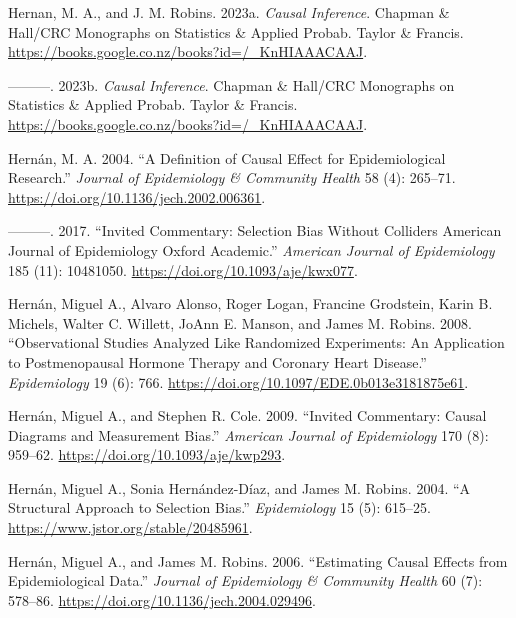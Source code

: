 \documentclass[
  singlecolumn]{report}
\newlength{\cslhangindent}
\newlength{\cslentryspacingunit} %
\newenvironment{CSLReferences}[2] %
 {%
  \setlength{\parindent}{0pt}
  \ifodd #1
  \let\oldpar\par
  \def\par{\hangindent=\cslhangindent\oldpar}
  \fi
  \setlength{\parskip}{#2\cslentryspacingunit}
 }%
 {}
\begin{document}
\begin{CSLReferences}{1}{0}
\leavevmode{}%
Hernan, M. A., and J. M. Robins. 2023a. \emph{Causal Inference}. Chapman
\& Hall/CRC Monographs on Statistics \& Applied Probab. Taylor \&
Francis. \url{https://books.google.co.nz/books?id=/_KnHIAAACAAJ}.

\leavevmode{}%
---------. 2023b. \emph{Causal Inference}. Chapman \& Hall/CRC
Monographs on Statistics \& Applied Probab. Taylor \& Francis.
\url{https://books.google.co.nz/books?id=/_KnHIAAACAAJ}.

\leavevmode{}%
Hernán, M. A. 2004. {``A Definition of Causal Effect for Epidemiological
Research.''} \emph{Journal of Epidemiology \& Community Health} 58 (4):
265--71. \url{https://doi.org/10.1136/jech.2002.006361}.

\leavevmode{}%
---------. 2017. {``Invited Commentary: Selection Bias Without Colliders
\textbar{} American Journal of Epidemiology \textbar{} Oxford
Academic.''} \emph{American Journal of Epidemiology} 185 (11): 10481050.
\url{https://doi.org/10.1093/aje/kwx077}.

\leavevmode{}%
Hernán, Miguel A., Alvaro Alonso, Roger Logan, Francine Grodstein, Karin
B. Michels, Walter C. Willett, JoAnn E. Manson, and James M. Robins.
2008. {``Observational Studies Analyzed Like Randomized Experiments: An
Application to Postmenopausal Hormone Therapy and Coronary Heart
Disease.''} \emph{Epidemiology} 19 (6): 766.
\url{https://doi.org/10.1097/EDE.0b013e3181875e61}.

\leavevmode{}%
Hernán, Miguel A., and Stephen R. Cole. 2009. {``Invited Commentary:
Causal Diagrams and Measurement Bias.''} \emph{American Journal of
Epidemiology} 170 (8): 959--62.
\url{https://doi.org/10.1093/aje/kwp293}.

\leavevmode{}%
Hernán, Miguel A., Sonia Hernández-Díaz, and James M. Robins. 2004. {``A
Structural Approach to Selection Bias.''} \emph{Epidemiology} 15 (5):
615--25. \url{https://www.jstor.org/stable/20485961}.

\leavevmode{}%
Hernán, Miguel A., and James M. Robins. 2006. {``Estimating Causal
Effects from Epidemiological Data.''} \emph{Journal of Epidemiology \&
Community Health} 60 (7): 578--86.
\url{https://doi.org/10.1136/jech.2004.029496}.


\end{CSLReferences}
\end{document}
